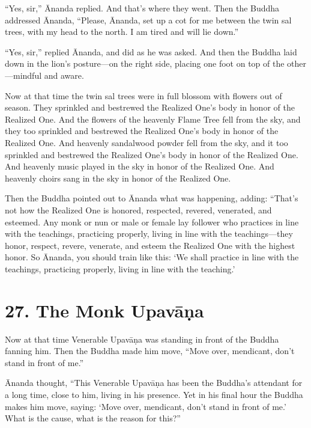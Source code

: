 \documentclass[12pt,openany]{book}%
\begin{document}
“Yes, sir,” Ānanda replied. And that’s where they went. Then the Buddha addressed Ānanda, “Please, Ānanda, set up a cot for me between the twin sal trees, with my head to the north. I am tired and will lie down.” 

“Yes, sir,” replied Ānanda, and did as he was asked. And then the Buddha laid down in the lion’s posture—on the right side, placing one foot on top of the other—mindful and aware. 

Now at that time the twin sal trees were in full blossom with flowers out of season. They sprinkled and bestrewed the Realized One’s body in honor of the Realized One. And the flowers of the heavenly Flame Tree fell from the sky, and they too sprinkled and bestrewed the Realized One’s body in honor of the Realized One. And heavenly sandalwood powder fell from the sky, and it too sprinkled and bestrewed the Realized One’s body in honor of the Realized One. And heavenly music played in the sky in honor of the Realized One. And heavenly choirs sang in the sky in honor of the Realized One. 

Then the Buddha pointed out to Ānanda what was happening, adding: “That’s not how the Realized One is honored, respected, revered, venerated, and esteemed. Any monk or nun or male or female lay follower who practices in line with the teachings, practicing properly, living in line with the teachings—they honor, respect, revere, venerate, and esteem the Realized One with the highest honor. So Ānanda, you should train like this: ‘We shall practice in line with the teachings, practicing properly, living in line with the teaching.’ 

\section*{27. The Monk \textsanskrit{Upavāṇa} }

Now at that time Venerable \textsanskrit{Upavāṇa} was standing in front of the Buddha fanning him. Then the Buddha made him move, “Move over, mendicant, don’t stand in front of me.” 

Ānanda thought, “This Venerable \textsanskrit{Upavāṇa} has been the Buddha’s attendant for a long time, close to him, living in his presence. Yet in his final hour the Buddha makes him move, saying: ‘Move over, mendicant, don’t stand in front of me.’ What is the cause, what is the reason for this?” 
\end{document}
